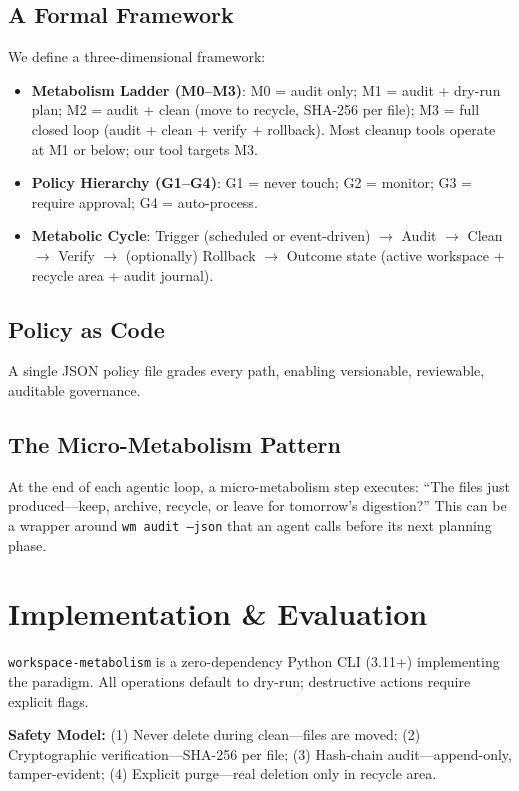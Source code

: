 \documentclass[sigconf,anonymous]{acmart}
\begin{document}
\subsection{A Formal Framework}
We define a three-dimensional framework:
\begin{itemize}
\item \textbf{Metabolism Ladder (M0--M3)}: M0 = audit only; M1 = audit + dry-run plan; M2 = audit + clean (move to recycle, SHA-256 per file); M3 = full closed loop (audit + clean + verify + rollback). Most cleanup tools operate at M1 or below; our tool targets M3.
\item \textbf{Policy Hierarchy (G1--G4)}: G1 = never touch; G2 = monitor; G3 = require approval; G4 = auto-process.
\item \textbf{Metabolic Cycle}: Trigger (scheduled or event-driven) $\rightarrow$ Audit $\rightarrow$ Clean $\rightarrow$ Verify $\rightarrow$ (optionally) Rollback $\rightarrow$ Outcome state (active workspace + recycle area + audit journal).
\end{itemize}

\subsection{Policy as Code}
A single JSON policy file grades every path, enabling versionable, reviewable, auditable governance.

\subsection{The Micro-Metabolism Pattern}
At the end of each agentic loop, a micro-metabolism step executes: ``The files just produced---keep, archive, recycle, or leave for tomorrow's digestion?'' This can be a wrapper around \texttt{wm audit --json} that an agent calls before its next planning phase.

\section{Implementation \& Evaluation}
\texttt{workspace-metabolism} is a zero-dependency Python CLI (3.11+) implementing the paradigm. All operations default to dry-run; destructive actions require explicit flags.

\textbf{Safety Model:} (1) Never delete during clean---files are moved; (2) Cryptographic verification---SHA-256 per file; (3) Hash-chain audit---append-only, tamper-evident; (4) Explicit purge---real deletion only in recycle area.
\end{document}
